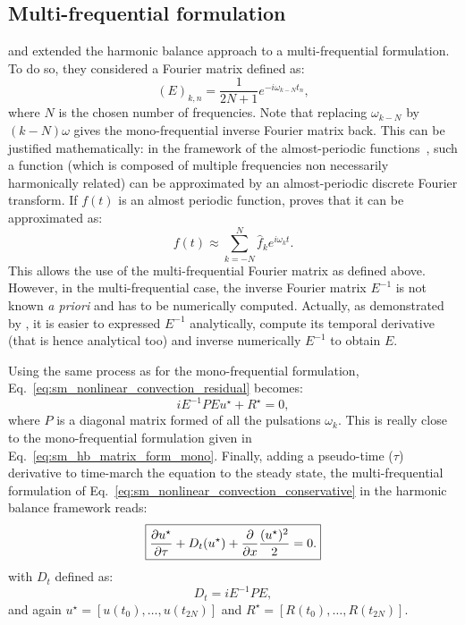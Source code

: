 \subsection{Multi-frequential formulation}
\citet{Gopinath2007} and \citet{Ekici2007} 
extended the harmonic balance approach to
a multi-frequential formulation. To do so, they considered
a Fourier matrix defined as:
\begin{equation}
	(E)_{k,n} = \frac{1}{2N+1} e^{-i \omega_{k-N} t_n},
\end{equation}
where $N$ is the chosen number of frequencies.
Note that replacing $\omega_{k-N}$ by $(k - N) \omega$ gives
the mono-frequential inverse Fourier matrix back. 
This can be justified mathematically: in the
framework of the almost-periodic functions~\cite{Besicovitch1932},
such a function (which is composed of multiple
frequencies non necessarily harmonically related) can be approximated
by an almost-periodic
discrete Fourier transform. If $f(t)$ is an almost periodic function,
\citet{Besicovitch1932} proves that it can be approximated as:
\begin{equation}
	f(t) \approx \sum_{k=-N}^{N} \widehat{f}_k 
	e^{i \omega_k t}.
\end{equation}
This allows the use of the multi-frequential Fourier matrix as defined
above. However, in the multi-frequential case, the inverse Fourier matrix
$E^{-1}$ is not known \textit{a priori} 
and has to be numerically computed. Actually, as demonstrated by 
\citet{Gopinath2007}, it is easier to expressed $E^{-1}$ analytically,
compute its temporal derivative (that is hence analytical too) 
and inverse numerically $E^{-1}$ to obtain $E$.

Using the same process as for the mono-frequential formulation,
Eq.~\eqref{eq:sm_nonlinear_convection_residual} becomes:
\begin{equation}
	i E^{-1} P E u^\star + R^\star = 0,
\end{equation}
where $P$ is a diagonal matrix formed of all the pulsations $\omega_k$.
This is really close to the mono-frequential formulation given
in Eq.~\eqref{eq:sm_hb_matrix_form_mono}.
Finally, adding a pseudo-time ($\tau$) derivative 
to time-march the equation to the steady state,
the multi-frequential formulation of 
Eq.~\eqref{eq:sm_nonlinear_convection_conservative} in the harmonic
balance framework reads:
\begin{equation}
	\fbox{$
	\displaystyle \frac{\partial u^\star}{\partial \tau} +
	D_t (u^\star) + 
	\displaystyle \frac{\partial}{\partial x}
		\frac{(u^\star)^2}{2} = 0.
	$}
\end{equation}
with $D_t$ defined as:
\begin{equation}
	D_t = i E^{-1} P E,
\end{equation}
and again $u^\star = [u(t_0), \ldots, u(t_{2N})]$ 
and $R^\star = [R(t_0), \ldots, R(t_{2N})]$.

